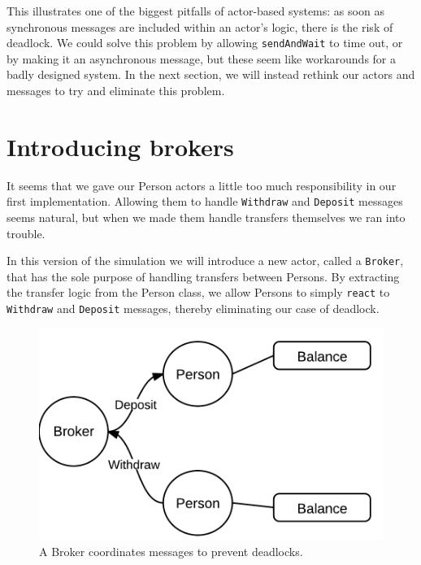 \documentclass[a4paper,12pt]{kth-mag}
\begin{document}
This illustrates one of the biggest pitfalls of actor-based systems: as soon as synchronous messages are included within an actor's logic, there is the risk of deadlock. We could solve this problem by allowing \texttt{sendAndWait} to time out, or by making it an asynchronous message, but these seem like workarounds for a badly designed system. In the next section, we will instead rethink our actors and messages to try and eliminate this problem.

\section{Introducing brokers}

It seems that we gave our Person actors a little too much responsibility in our first implementation. Allowing them to handle \texttt{Withdraw} and \texttt{Deposit} messages seems natural, but when we made them handle transfers themselves we ran into trouble.

In this version of the simulation we will introduce a new actor, called a \texttt{Broker}, that has the sole purpose of handling transfers between Persons. By extracting the transfer logic from the Person class, we allow Persons to simply \texttt{react} to \texttt{Withdraw} and \texttt{Deposit} messages, thereby eliminating our case of deadlock. 

\begin{figure}[H]
    \begin{center}
    \includegraphics{images/ActorsBroker.png}
    \end{center}
    \caption{A Broker coordinates messages to prevent deadlocks.}
    \label{fig:actorsBrooker}
\end{figure}
\end{document}
